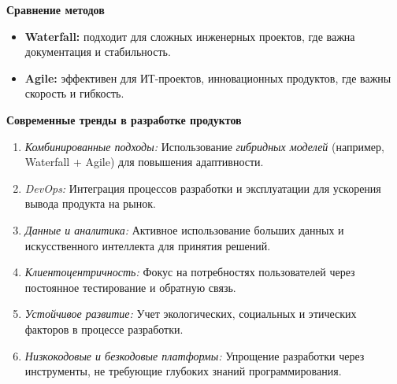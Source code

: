 \textbf{Сравнение методов}
\begin{itemize}
    \item \textbf{Waterfall:} подходит для сложных инженерных проектов, где важна документация и стабильность.
    \item \textbf{Agile:} эффективен для ИТ-проектов, инновационных продуктов, где важны скорость и гибкость.
\end{itemize}

\textbf{Современные тренды в разработке продуктов}

\begin{enumerate}
    \item \textit{Комбинированные подходы:} Использование \textit{гибридных моделей} (например, Waterfall + Agile) для повышения адаптивности.
    \item \textit{DevOps:} Интеграция процессов разработки и эксплуатации для ускорения вывода продукта на рынок.
    \item \textit{Данные и аналитика:} Активное использование больших данных и искусственного интеллекта для принятия решений.
    \item \textit{Клиентоцентричность:} Фокус на потребностях пользователей через постоянное тестирование и обратную связь.
    \item \textit{Устойчивое развитие:} Учет экологических, социальных и этических факторов в процессе разработки.
    \item \textit{Низкокодовые и безкодовые платформы:} Упрощение разработки через инструменты, не требующие глубоких знаний программирования.
\end{enumerate}

\pagebreak
